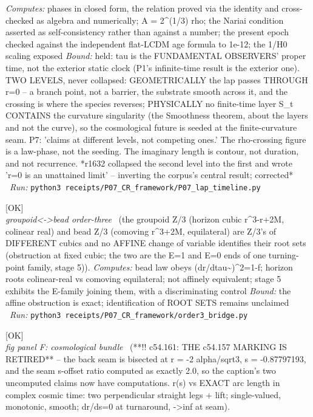 \begin{description}
\emph{Computes:} phases in closed form, the relation proved via the identity and cross-checked as algebra and numerically; A = 2\textasciicircum{}(1/3) rho; the Nariai condition asserted as self-consistency rather than against a number; the present epoch checked against the independent flat-LCDM age formula to 1e-12; the 1/H0 scaling exposed
 \emph{Bound:} held: tau is the FUNDAMENTAL OBSERVERS' proper time, not the exterior static clock (P1's infinite-time result is the exterior one). TWO LEVELS, never collapsed: GEOMETRICALLY the lap passes THROUGH r=0 -- a branch point, not a barrier, the substrate smooth across it, and the crossing is where the species reverses; PHYSICALLY no finite-time layer S\_t CONTAINS the curvature singularity (the Smoothness theorem, about the layers and not the curve), so the cosmological future is seeded at the finite-curvature seam. P7: 'claims at different levels, not competing ones.' The rho-crossing figure is a law-phase, not the seeding. The imaginary length is contour, not duration, and not recurrence. *r1632 collapsed the second level into the first and wrote 'r=0 is an unattained limit' -- inverting the corpus's central result; corrected*
\ \emph{Run:} \texttt{python3 receipts/P07\_CR\_framework/P07\_lap\_timeline.py}
\item[\label{rcpt:order3_bridge}\texttt{order3\_bridge}]\hfill\textsf{[OK]}\\
\textit{groupoid<->bead order-three} \ (the groupoid Z/3 (horizon cubic r\textasciicircum{}3-r+2M, colinear real) and bead Z/3 (comoving r\textasciicircum{}3+2M, equilateral) are Z/3's of DIFFERENT cubics and no AFFINE change of variable identifies their root sets (obstruction at fixed cubic; the two are the E=1 and E=0 ends of one turning-point family, stage 5)). 
\emph{Computes:} bead law obeys (dr/dtau\textasciitilde{})\textasciicircum{}2=1-f; horizon roots colinear-real vs comoving equilateral; not affinely equivalent; stage 5 exhibits the E-family joining them, with a discriminating control
 \emph{Bound:} the affine obstruction is exact; identification of ROOT SETS remains unclaimed
\ \emph{Run:} \texttt{python3 receipts/P07\_CR\_framework/order3\_bridge.py}
\item[\label{rcpt:F_flat}\texttt{F\_flat}]\hfill\textsf{[OK]}\\
\textit{fig panel F: cosmological bundle} \ (**!! c54.161: THE c54.157 MARKING IS RETIRED** -- the back seam is bisected at r = -2 alpha/sqrt3, s = -0.87797193, and the seam s-offset ratio computed as exactly 2.0, so the caption's two uncomputed claims now have computations. r(s) vs EXACT arc length in complex cosmic time: two perpendicular straight legs + lift; single-valued, monotonic, smooth; dr/ds=0 at turnaround, ->inf at seam). 

\end{description}
